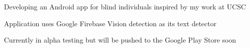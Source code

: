 \documentclass[letterpaper]{deedy-resume} %
\begin{document}
\begin{minipage}[t]{0.66\textwidth}
\sectionspace

\begin{tightitemize}
	\item Developing an Android app for blind individuals inspired by my work at UCSC
	\item Application uses Google Firebase Vision detection as its text detector
	\item Currently in alpha testing but will be pushed to the Google Play Store soon 
\end{tightitemize}
\end{minipage} %
\end{document}
